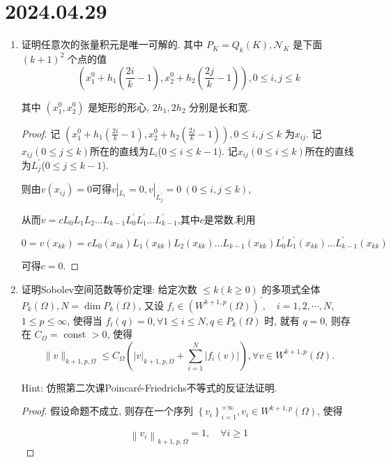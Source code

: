 \documentclass[12pt,a4paper]{article}
\begin{document}
	\newpage
	
	\section*{2024.04.29}	
	
	\begin{enumerate}
		\item 证明任意次的张量积元是唯一可解的. 其中 $P_K=Q_k(K), \mathcal{N}_K$ 是下面 $(k+1)^2$ 个点的值
		$$
		\left(x_1^0+h_1\left(\frac{2 i}{k}-1\right), x_2^0+h_2\left(\frac{2 j}{k}-1\right)\right), 0 \leq i, j \leq k
		$$
		
		其中 $\left(x_1^0, x_2^0\right)$ 是矩形的形心, $2 h_1, 2 h_2$ 分别是长和宽.
		
		\begin{proof}
			记 $	\left(x_1^0+h_1\left(\frac{2 i}{k}-1\right), x_2^0+h_2\left(\frac{2 j}{k}-1\right)\right),0 \leq i, j \leq k$
			为$x_{ij}$. 记$x_{ij}(0 \leq j \leq k)$所在的直线为$L_i$($0 \leq i \leq k-1$). 记$x_{ij}(0 \leq i \leq k)$所在的直线为$L^\prime_j$($0 \leq j \leq k-1$). 
			
			则由$v(x_{ij})=0$可得$v|_{L_i}=0,v|_{L^\prime_j}=0 \ (0 \leq i, j \leq k)$,
			
			从而$v=cL_0L_1 L_2...L_{k-1} L^\prime_0 L^\prime_1...L^\prime_{k-1}$,其中$c$是常数.利用
			
			$$
			0 = v(x_{kk})=cL_0(x_{kk})L_1(x_{kk}) L_2(x_{kk})...L_{k-1}(x_{kk}) L^\prime_0 L^\prime_1(x_{kk})...L^\prime_{k-1}(x_{kk})
			$$
			
			可得$c = 0$.
		\end{proof}
		
		\item 证明Sobolev空间范数等价定理: 给定次数 $\leq k(k \geq 0)$ 的多项式全体 $P_k(\Omega), N=\operatorname{dim} P_k(\Omega)$, 又设 $f_i \in\left(W^{k+1, p}(\Omega)\right)^{\prime}, \quad i=1,2, \cdots, N$, $1 \leq p \leq \infty$, 使得当 $f_i(q)=0, \forall 1 \leq i \leq N, q \in P_k(\Omega)$ 时, 就有 $q=0$, 则存在 $C_{\Omega}=$ const $>0$, 使得
		$$
		\|v\|_{k+1, p, \Omega} \leq C_{\Omega}\left(|v|_{k+1, p, \Omega}+\sum_{i=1}^N\left|f_i(v)\right|\right), \forall v \in W^{k+1, p}(\Omega) .
		$$
		
		Hint: 仿照第二次课Poincaré-Friedrichs不等式的反证法证明.
		
		\begin{proof}
			假设命题不成立, 则存在一个序列 $\left\{v_i\right\}_{i=1}^{+\infty}, v_i \in W^{k+1, p}(\Omega)$, 使得
			
			\begin{equation}
				\left\|v_i\right\|_{k+1, p, \Omega}=1, \quad \forall i \geqslant 1 \label{norm}
			\end{equation}
			

\end{proof}
\end{enumerate}
\end{document}
